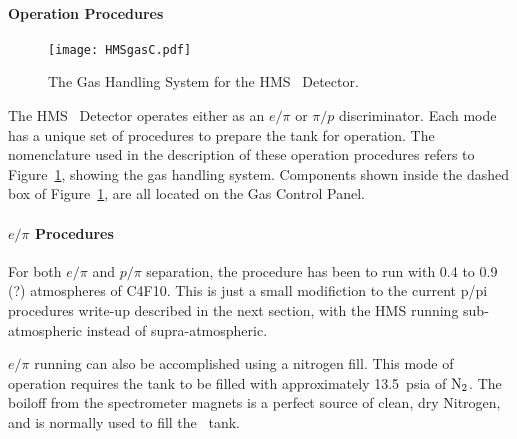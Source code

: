 {\paragraph{Operation Procedures}

\begin{figure}
\texttt{[image: HMSgasC.pdf]}
\caption{The Gas Handling System for the HMS \Cerenkov\ Detector. \label{fig:gas}}
\end{figure}

The HMS \Cerenkov\ Detector operates either as an $e/\pi$ or $\pi/p$
discriminator. Each mode has a unique set of procedures to prepare the tank
for operation. The nomenclature used in the description of these operation
procedures refers to Figure~\ref{fig:gas}, showing the gas handling system. Components
shown
inside the dashed box of Figure~\ref{fig:gas}, are all located on the Gas Control Panel.

\paragraph{$e/\pi$ Procedures}
For both $e/\pi$ and $p/\pi$ separation, the procedure
has been to run with 0.4 to
0.9 (?) atmospheres of C4F10.  This is just a small modifiction to the
current p/pi procedures write-up described in the next section,
with the HMS running sub-atmospheric instead of supra-atmospheric.

$e/\pi$ running can also be accomplished using a nitrogen fill.
This mode of operation requires the tank to be filled with approximately
13.5~psia of $\rm{N_2}$.  The boiloff from the spectrometer magnets is a
perfect source of clean, dry Nitrogen, and is normally used to fill the
\Cerenkov\ tank.

}
